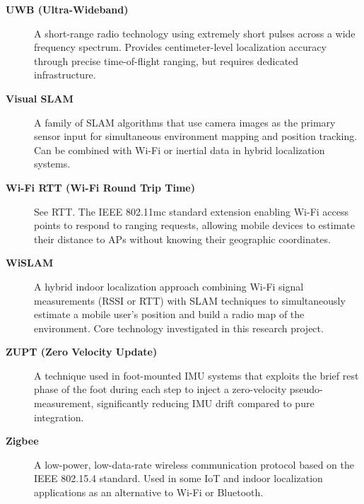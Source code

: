 \documentclass{ipgpmaster}
\begin{document}
\begin{description}
\item[\textbf{UWB (Ultra-Wideband)}]
A short-range radio technology using extremely short pulses across a wide frequency spectrum. Provides centimeter-level localization accuracy through precise time-of-flight ranging, but requires dedicated infrastructure.

\item[\textbf{Visual SLAM}]
A family of SLAM algorithms that use camera images as the primary sensor input for simultaneous environment mapping and position tracking. Can be combined with Wi-Fi or inertial data in hybrid localization systems.

\item[\textbf{Wi-Fi RTT (Wi-Fi Round Trip Time)}]
See RTT. The IEEE 802.11mc standard extension enabling Wi-Fi access points to respond to ranging requests, allowing mobile devices to estimate their distance to APs without knowing their geographic coordinates.

\item[\textbf{WiSLAM}]
A hybrid indoor localization approach combining Wi-Fi signal measurements (RSSI or RTT) with SLAM techniques to simultaneously estimate a mobile user's position and build a radio map of the environment. Core technology investigated in this research project.

\item[\textbf{ZUPT (Zero Velocity Update)}]
A technique used in foot-mounted IMU systems that exploits the brief rest phase of the foot during each step to inject a zero-velocity pseudo-measurement, significantly reducing IMU drift compared to pure integration.

\item[\textbf{Zigbee}]
A low-power, low-data-rate wireless communication protocol based on the IEEE 802.15.4 standard. Used in some IoT and indoor localization applications as an alternative to Wi-Fi or Bluetooth.

\end{description}
\cleardoublepage
  
\end{document}
